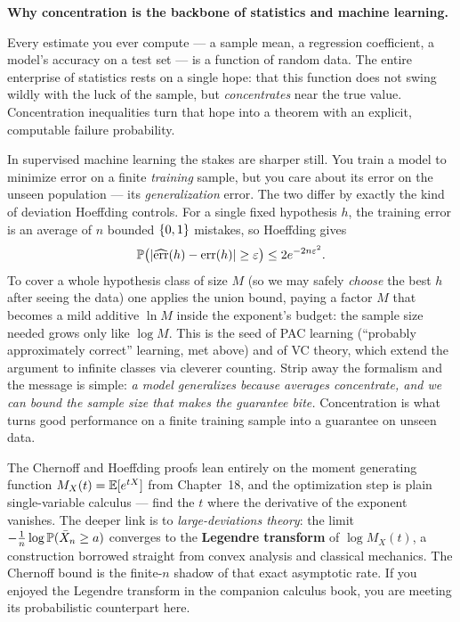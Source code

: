 \begin{applicationbox}
\textbf{Why concentration is the backbone of statistics and machine learning.}

Every estimate you ever compute --- a sample mean, a regression coefficient,
a model's accuracy on a test set --- is a function of random data. The entire
enterprise of statistics rests on a single hope: that this function does not
swing wildly with the luck of the sample, but \emph{concentrates} near the
true value. Concentration inequalities turn that hope into a theorem with an
explicit, computable failure probability.

In supervised machine learning the stakes are sharper still. You train a model
to minimize error on a finite \emph{training} sample, but you care about its
error on the unseen population --- its \emph{generalization} error. The two
differ by exactly the kind of deviation Hoeffding controls. For a single fixed
hypothesis $h$, the training error is an average of $n$ bounded $\set{0,1}$
mistakes, so Hoeffding gives
\[
  \P\bigl(\abs{\widehat{\mathrm{err}}(h) - \mathrm{err}(h)} \ge \eps\bigr)
  \le 2 e^{-2n\eps^2}.
\]
To cover a whole hypothesis class of size $M$ (so we may safely \emph{choose}
the best $h$ after seeing the data) one applies the union bound, paying a
factor $M$ that becomes a mild additive $\ln M$ inside the exponent's budget:
the sample size needed grows only like $\log M$. This is the seed of
PAC learning (``probably approximately correct'' learning, met above) and of VC theory,
which extend the argument to infinite classes via cleverer counting. Strip
away the formalism and the message is simple: \emph{a model generalizes
because averages concentrate, and we can bound the sample size that makes the
guarantee bite.} Concentration is what turns good performance on a finite
training sample into a guarantee on unseen data.
\end{applicationbox}

\begin{connectionbox}
The Chernoff and Hoeffding proofs lean entirely on the moment generating
function $M_X(t) = \E[e^{tX}]$ from Chapter~18, and
the optimization step is plain single-variable calculus --- find the $t$ where
the derivative of the exponent vanishes. The deeper link is to
\emph{large-deviations theory}: the limit $-\frac1n \log \P(\bar X_n \ge a)$
converges to the \textbf{Legendre transform} of $\log M_X(t)$, a construction
borrowed straight from convex analysis and classical mechanics. The Chernoff
bound is the finite-$n$ shadow of that exact asymptotic rate. If you enjoyed
the Legendre transform in the companion calculus book, you are meeting its
probabilistic counterpart here.
\end{connectionbox}

